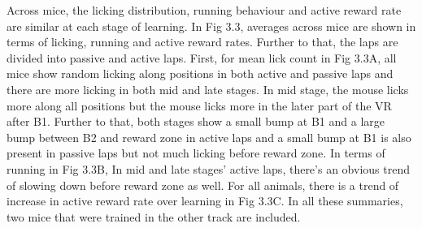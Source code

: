 Across mice, the licking distribution, running behaviour and active reward rate are similar at each stage of learning. In Fig 3.3, averages across mice are shown in terms of licking, running and active reward rates. Further to that, the laps are divided into passive and active laps. First, for mean lick count in Fig 3.3A, all mice show random licking along positions in both active and passive laps and there are more licking in both mid and late stages. In mid stage, the mouse licks more along all positions but the mouse licks more in the later part of the VR after B1. Further to that, both stages show a small bump at B1 and a large bump between B2 and reward zone in active laps and a small bump at B1 is also present in passive laps but not much licking before reward zone. In terms of running in Fig 3.3B, In mid and late stages' active laps, there's an obvious trend of slowing down before reward zone as well. For all animals, there is a trend of increase in active reward rate over learning in Fig 3.3C. In all these summaries, two mice that were trained in the other track are included.





